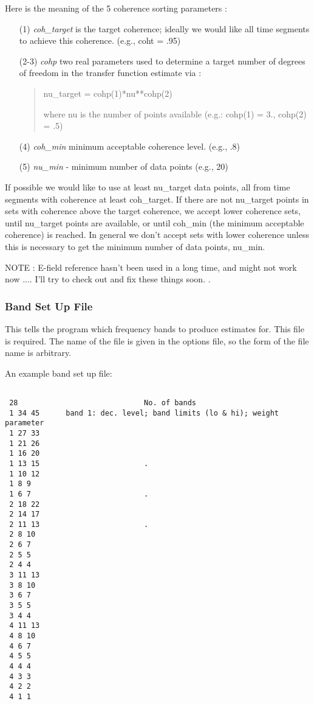 Here is the meaning of the 5 coherence sorting parameters :

\begin{itemize}

\item[(1)]
{\it coh\_target} is the target coherence; ideally we would like
all time segments to achieve this coherence.  (e.g., coht = .95)

\item[(2-3)]
{\it cohp} two real parameters used to determine a target number of degrees
of freedom in the transfer function estimate via : 
\begin{quote}
nu\_target = cohp(1)*nu**cohp(2) 

where nu is the number of points available (e.g.: cohp(1) = 3., cohp(2) = .5)
\end{quote}

\item[(4)]
{\it coh\_min} minimum acceptable coherence level. (e.g., .8)

\item[(5)]
{\it nu\_min}  - minimum number of data points (e.g., 20)
\end{itemize}

If possible we would like to use at least nu\_target data points,
all from time segments with coherence at least coh\_target.
If there are not nu\_target points in sets with
coherence above the target coherence, we accept lower coherence
sets, until nu\_target points are available, or until
coh\_min (the minimum acceptable coherence) is reached.  In general
we don't accept sets with lower coherence unless this is necessary
to get the minimum number of data points, nu\_min.

NOTE :  E-field reference hasn't been used in a long time, and might not
work now ....  I'll try to check out and fix these things soon.
.

\subsubsection{Band Set Up File}
This tells the program which frequency bands to produce estimates for.
This file is required.
The name of the file is given in the options file, 
so the form of the file name is arbitrary.

An example band set up file:

\begin{verbatim}

 28                             No. of bands
 1 34 45      band 1: dec. level; band limits (lo & hi); weight parameter
 1 27 33 
 1 21 26 
 1 16 20
 1 13 15                        .
 1 10 12
 1 8 9
 1 6 7                          .
 2 18 22
 2 14 17
 2 11 13                        .
 2 8 10
 2 6 7 
 2 5 5
 2 4 4
 3 11 13
 3 8 10
 3 6 7
 3 5 5
 3 4 4
 4 11 13
 4 8 10
 4 6 7
 4 5 5
 4 4 4
 4 3 3
 4 2 2
 4 1 1
\end{verbatim}
\normalsize

